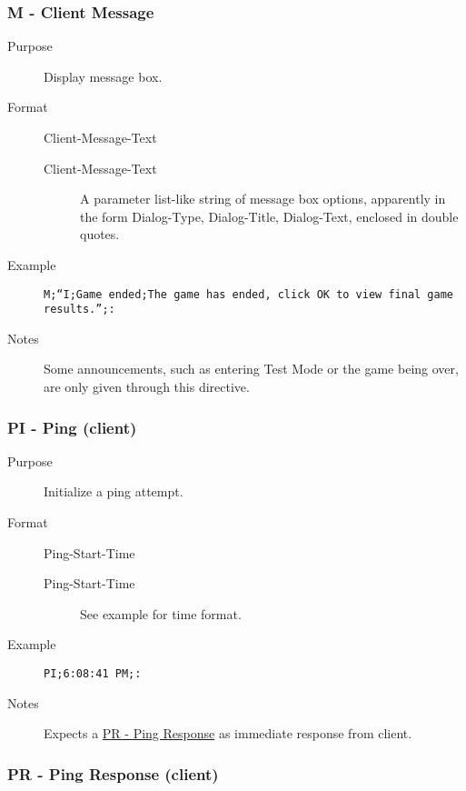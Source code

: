 \documentclass{article}
\providecommand{\wiredata}[1]{\texttt{{#1}}}
\begin{document}

\subsubsection{M - Client Message} %
\label{ssub:m_client_message}

\begin{description}
  \item[Purpose] Display message box.
  \item[Format] Client-Message-Text
  \begin{description}
    \item[Client-Message-Text] A parameter list-like string of message box options, apparently in the form Dialog-Type, Dialog-Title, Dialog-Text, enclosed in double quotes.
  \end{description}
  \item[Example] \wiredata{M;``I;Game ended;The game has ended, click OK to view final game results.'';:}
  \item[Notes] Some announcements, such as entering Test Mode or the game being over, are only given through this directive.
\end{description}


\subsubsection{PI - Ping (client)} %
\label{ssub:pi_ping_client_}

\begin{description}
  \item[Purpose] Initialize a ping attempt.
  \item[Format] Ping-Start-Time
  \begin{description}
    \item[Ping-Start-Time] See example for time format.
  \end{description}
  \item[Example] \wiredata{PI;6:08:41 PM;:}
  \item[Notes] Expects a \hyperref[ssub:pr_ping_response_client_]{PR - Ping Response} as immediate response from client.
\end{description}


\subsubsection{PR - Ping Response (client)} %
\label{ssub:pr_ping_response_client_}
\end{document}
